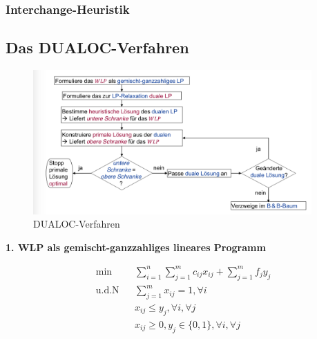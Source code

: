       \subsubsection{Interchange-Heuristik}


    \subsection{Das DUALOC-Verfahren} %
    \label{sub:das_dualoc_verfahren}

      \begin{figure}[H]
        \centering
        \includegraphics[width=0.95\textwidth]{Images/DUALOC_Verfahren.png}
        \caption{DUALOC-Verfahren}
        \label{fig:DUALOC_Verfahren}
      \end{figure}

      \begin{exmp}
          \color{blue}{Aufgabe 15, 16}
        \end{exmp}

      \par \textbf{1. WLP als gemischt-ganzzahliges lineares Programm}

      \begin{equation}
        \begin{aligned}
          & \underset{}{\text{min}}
          && \sum_{i=1}^{n}\sum_{j=1}^{m}c_{ij}x_{ij} + \sum_{j=1}^{m}f_jy_{j}\\
          & \text{u.d.N}
          & & \sum_{j=1}^{m}x_{ij}=1, \forall i \\
          & & & x_{ij} \leq y_j, \forall i, \forall j \\ 
          & & & x_{ij} \geq 0, y_j \in \{0,1\}, \forall i, \forall j \\
        \end{aligned}
      \end{equation}

